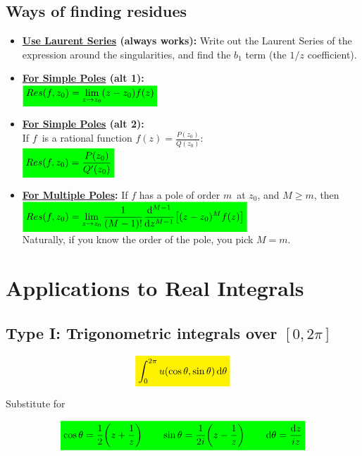 \documentclass[10pt,a4paper]{article}
\newcommand{\yl}[1]{\colorbox{yellow}{$\displaystyle #1$}}
\newcommand{\gr}[1]{\colorbox{green}{$\displaystyle #1$}}
\begin{document}
\begin{multicols}{2}
\subsection*{Ways of finding residues}
\begin{itemize}
    \item \textbf{\underline{Use Laurent Series} (always works):} Write out the Laurent Series of the expression around the singularities, and find the $b_1$ term (the $1/z$ coefficient).
    \item \textbf{\underline{For Simple Poles} (alt 1):} \\
    $\gr{Res(f, z_0) = \lim\limits_{z\rightarrow z_0}(z-z_0)f(z)}$\\
    \item \textbf{\underline{For Simple Poles} (alt 2):}\\
    If $f$ is a rational function $f(z) = \frac{P(z_0)}{Q(z_0)}$:\\
    $\gr{Res(f,z_0) = \frac{P(z_0)}{Q'(z_0)}}$
    \item \textbf{\underline{For Multiple Poles}:} If $f$ has a pole of order $m$ at $z_0$, and $M\geq m$, then\\
    $\gr{Res(f,z_0) = \lim\limits_{z\rightarrow z_0} \frac{1}{(M-1)!} \dv[M-1]{z}\qty[(z-z_0)^M f(z)]}$
    \\
    Naturally, if you know the order of the pole, you pick $M=m$.
\end{itemize}




\newpage
\section*{Applications to Real Integrals}
\subsection*{Type I: Trigonometric integrals over $[0, 2\pi]$}
\[\yl{
    \int_0^{2\pi} u(\cos{\theta}, \sin{\theta}) \dd{\theta}
}\]

Substitute for

\[\gr{
    \cos{\theta} = \dfrac{1}{2}\qty(z+\dfrac{1}{z}) \quad\quad \sin{\theta} = \dfrac{1}{2i}\qty(z-\dfrac{1}{z}) \quad\quad \dd{\theta} = \dfrac{\dd{z}}{iz}
}\]


\end{multicols}
\end{document}
